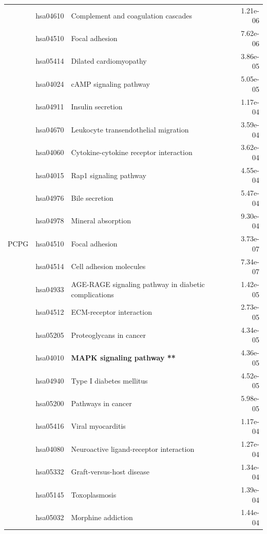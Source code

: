 \begin{longtable}{cllr}
 & hsa04610 & \textcolor{\clrnew}{Complement and coagulation cascades} & 1.21e-06 \\ 
 & hsa04510 & \textcolor{\clrnew}{Focal adhesion} & 7.62e-06 \\ 
 & hsa05414 & \textcolor{\clrnew}{Dilated cardiomyopathy} & 3.86e-05 \\ 
 & hsa04024 & \textcolor{\clrnew}{cAMP signaling pathway} & 5.05e-05 \\ 
 & hsa04911 & \textcolor{\clrnew}{Insulin secretion} & 1.17e-04 \\ 
 & hsa04670 & \textcolor{\clrnew}{Leukocyte transendothelial migration} & 3.59e-04 \\ 
 & hsa04060 & \textcolor{\clrnew}{Cytokine-cytokine receptor interaction} & 3.62e-04 \\ 
 & hsa04015 & \textcolor{\clrnew}{Rap1 signaling pathway} & 4.55e-04 \\ 
 & hsa04976 & \textcolor{\clrnew}{Bile secretion} & 5.47e-04 \\ 
 & hsa04978 & \textcolor{\clrnew}{Mineral absorption} & 9.30e-04 \\ 
\midrule 
PCPG & hsa04510 & \textcolor{\clrnew}{Focal adhesion} & 3.73e-07\\ 
 & hsa04514 & \textcolor{\clrnew}{Cell adhesion molecules} & 7.34e-07 \\ 
 & hsa04933 & \textcolor{\clrnew}{AGE-RAGE signaling pathway in diabetic complications} & 1.42e-05 \\ 
 & hsa04512 & \textcolor{\clrnew}{ECM-receptor interaction} & 2.73e-05 \\ 
 & hsa05205 & \textcolor{\clrnew}{Proteoglycans in cancer} & 4.34e-05 \\ 
 \rowcolor{\clrpath}& hsa04010 & \textbf{MAPK signaling pathway **} & 4.36e-05 \\ 
 & hsa04940 & \textcolor{\clrnew}{Type I diabetes mellitus} & 4.52e-05 \\ 
 & hsa05200 & \textcolor{\clrnew}{Pathways in cancer} & 5.98e-05 \\ 
 & hsa05416 & \textcolor{\clrnew}{Viral myocarditis} & 1.17e-04 \\ 
 & hsa04080 & \textcolor{\clrnew}{Neuroactive ligand-receptor interaction} & 1.27e-04 \\ 
 & hsa05332 & \textcolor{\clrnew}{Graft-versus-host disease} & 1.34e-04 \\ 
 & hsa05145 & \textcolor{\clrnew}{Toxoplasmosis} & 1.39e-04 \\ 
 & hsa05032 & \textcolor{\clrnew}{Morphine addiction} & 1.44e-04 \\ 

\end{longtable}
